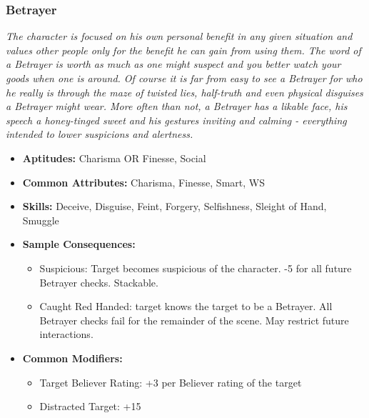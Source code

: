\subsubsection{Betrayer}\label{Betrayer}
\textit{The character is focused on his own personal benefit in any given situation and values other people only for the benefit he can gain from using them.
The word of a Betrayer is worth as much as one might suspect and you better watch your goods when one is around.
Of course it is far from easy to see a Betrayer for who he really is through the maze of twisted lies, half-truth and even physical disguises a Betrayer might wear.
More often than not, a Betrayer has a likable face, his speech a honey-tinged sweet and his gestures inviting and calming - everything intended to lower suspicions and alertness.}
\begin{itemize}
	\item \textbf{Aptitudes:} Charisma OR Finesse, Social
	\item \textbf{Common Attributes:}  Charisma, Finesse, Smart, WS
	\item \textbf{Skills:} Deceive, Disguise, Feint, Forgery, Selfishness, Sleight of Hand, Smuggle
	\item \textbf{Sample Consequences:} 
	\begin{itemize}
		\item Suspicious: Target becomes suspicious of the character. -5 for all future Betrayer checks. Stackable.
		\item Caught Red Handed: target knows the target to be a Betrayer. All Betrayer checks fail for the remainder of the scene. May restrict future interactions.
	\end{itemize}
	\item \textbf{Common Modifiers:}
	\begin{itemize}
		\item Target Believer Rating: +3 per Believer rating of the target
		\item Distracted Target: +15
	\end{itemize}
\end{itemize}

